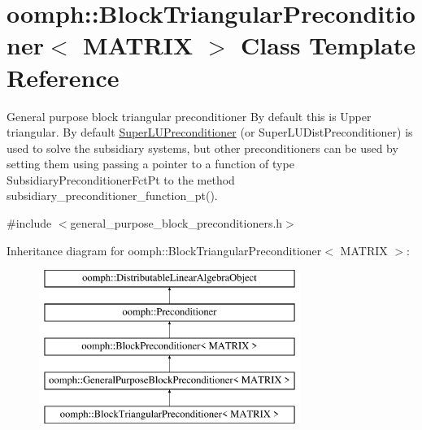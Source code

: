 \hypertarget{classoomph_1_1BlockTriangularPreconditioner}{}\section{oomph\+:\+:Block\+Triangular\+Preconditioner$<$ M\+A\+T\+R\+IX $>$ Class Template Reference}
\label{classoomph_1_1BlockTriangularPreconditioner}


General purpose block triangular preconditioner By default this is Upper triangular. By default \hyperlink{classoomph_1_1SuperLUPreconditioner}{Super\+L\+U\+Preconditioner} (or Super\+L\+U\+Dist\+Preconditioner) is used to solve the subsidiary systems, but other preconditioners can be used by setting them using passing a pointer to a function of type Subsidiary\+Preconditioner\+Fct\+Pt to the method subsidiary\+\_\+preconditioner\+\_\+function\+\_\+pt().  




{\ttfamily \#include $<$general\+\_\+purpose\+\_\+block\+\_\+preconditioners.\+h$>$}

Inheritance diagram for oomph\+:\+:Block\+Triangular\+Preconditioner$<$ M\+A\+T\+R\+IX $>$\+:\begin{figure}[H]
\begin{center}
\leavevmode
\includegraphics[height=5.000000cm]{classoomph_1_1BlockTriangularPreconditioner}
\end{center}
\end{figure}
